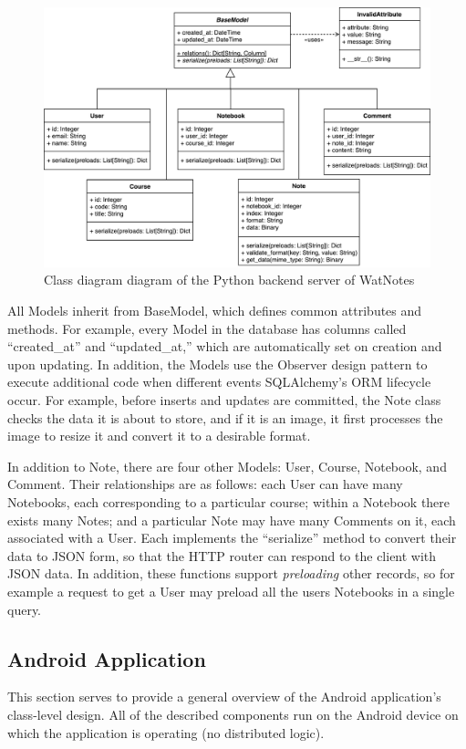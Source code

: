 \documentclass[12pt]{article}
\begin{document}
    \begin{figure}[H]
      \includegraphics[width=\textwidth]{assets/backend-class.pdf}
      \caption{Class diagram diagram of the Python backend server of WatNotes}
    \end{figure}

    All Models inherit from BaseModel, which defines common attributes and
    methods. For example, every Model in the database has columns called
    ``created\_at'' and ``updated\_at,'' which are automatically set on creation
    and upon updating. In addition, the Models use the Observer design pattern
    to execute additional code when different events SQLAlchemy's ORM lifecycle
    occur. For example, before inserts and updates are committed, the Note class
    checks the data it is about to store, and if it is an image, it first
    processes the image to resize it and convert it to a desirable format.

    In addition to Note, there are four other Models: User, Course, Notebook,
    and Comment. Their relationships are as follows: each User can have many
    Notebooks, each corresponding to a particular course; within a Notebook
    there exists many Notes; and a particular Note may have many Comments on it,
    each associated with a User. Each implements the ``serialize'' method to
    convert their data to JSON form, so that the HTTP router can respond to the
    client with JSON data. In addition, these functions support
    \emph{preloading} other records, so for example a request to get a User may
    preload all the users Notebooks in a single query.

  \subsection{Android Application}
    This section serves to provide a general overview of the Android application's class-level design. All of the described components run on the Android
    device on which the application is operating (no distributed logic). \\
\end{document}
